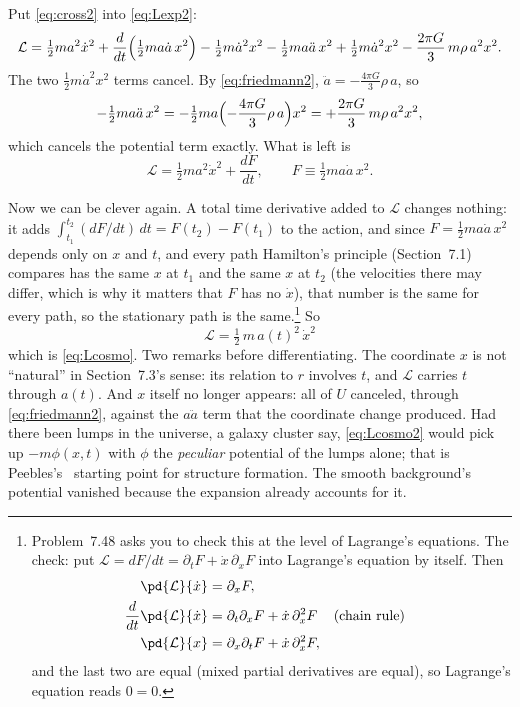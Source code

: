 \documentclass[12pt]{article}
\numberwithin{equation}{section}
\newcommand{\Lag}{\mathcal{L}}
\begin{document}
Put \eqref{eq:cross2} into \eqref{eq:Lexp2}:
\begin{equation}
  \Lag = \tfrac12 m a^2\dot x^2 + \frac{d}{dt}\Bigl(\tfrac12 m a\dot a\, x^2\Bigr)
  - \tfrac12 m\dot a^2 x^2 - \tfrac12 m a\ddot a\, x^2
  + \tfrac12 m\dot a^2 x^2 - \frac{2\pi G}{3}\, m\rho\, a^2 x^2 .
\end{equation}
The two $\tfrac12 m\dot a^2 x^2$ terms cancel. By \eqref{eq:friedmann2},
$\ddot a = -\frac{4\pi G}{3}\rho\, a$, so
\begin{equation*}
  -\tfrac12 m a\ddot a\, x^2
  = -\tfrac12 m a\Bigl(-\frac{4\pi G}{3}\rho\, a\Bigr)x^2 = +\frac{2\pi G}{3}\, m\rho\, a^2 x^2 ,
\end{equation*}
which cancels the potential term exactly. What is left is
\begin{equation}
  \label{eq:Lcomoving2}
  \Lag = \tfrac12 m a^2\dot x^2 + \frac{dF}{dt}, \qquad F \equiv \tfrac12 m a\dot a\, x^2 .
\end{equation}

Now we can be clever again. A total time derivative added to $\Lag$ changes nothing: it adds $\int_{t_1}^{t_2}(dF/dt)\,dt = F(t_2) - F(t_1)$ to the
action, and since $F = \tfrac12 m a\dot a\,x^2$ depends only on $x$ and $t$, and every path
Hamilton's principle (Section~7.1) compares has the same $x$ at $t_1$ and the same $x$ at
$t_2$ (the velocities there may differ, which is why it matters that $F$ has no $\dot x$),
that number is the same for every path, so the stationary path is the
same.\footnote{Problem~7.48 asks you to check this at the level of Lagrange's
  equations. The check: put $\Lag = dF/dt = \partial_t F + \dot x\,\partial_x F$
  into Lagrange's equation by itself. Then
  \begin{align*}
    \pd{\Lag}{\dot x} &= \partial_x F,\\
    \frac{d}{dt}\pd{\Lag}{\dot x} &= \partial_t\partial_x F + \dot x\,\partial_x^2 F
    && \text{(chain rule)}\\
    \pd{\Lag}{x} &= \partial_x\partial_t F + \dot x\,\partial_x^2 F ,
  \end{align*}
  and the last two are equal (mixed partial derivatives are equal), so Lagrange's
  equation reads $0 = 0$.} So
\begin{equation}
  \label{eq:Lcosmo2}
  \boxed{\;\Lag = \tfrac12\, m\, a(t)^2\, \dot x^2\;}
\end{equation}
which is \eqref{eq:Lcosmo}. Two remarks before differentiating. The coordinate $x$ is not
``natural'' in Section~7.3's sense: its relation to $r$ involves $t$, and $\Lag$ carries
$t$ through $a(t)$. And $x$ itself no longer appears: all of $U$ canceled, through \eqref{eq:friedmann2}, against the
$a\ddot a$ term that the coordinate change produced. Had there been lumps in the universe, a
galaxy cluster say, \eqref{eq:Lcosmo2} would pick up $-m\phi(x,t)$ with $\phi$ the
\emph{peculiar} potential of the lumps alone; that is Peebles's~\cite{peebles} starting point
for structure formation. The smooth background's potential vanished because the expansion
already accounts for it.
\end{document}
